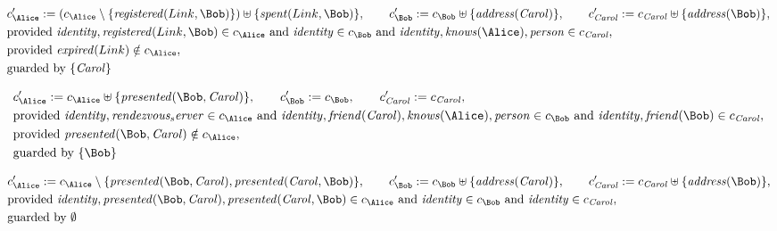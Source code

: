 \begin{align*}
&
c'_
{
\Alice
}
 := 
(c_
{
\Alice
}
 \setminus 
\{
\mathit{
registered
}
(
Link
,
\Bob
)
\}
) \uplus 
\{
\mathit{
spent
}
(
Link
,
\Bob
)
\}
, \qquad 
c'_
{
\Bob
}
 := 
c_
{
\Bob
}
 \uplus 
\{
\mathit{
address
}
(
\mathit{Carol}
)
\}
, \qquad 
c'_
{
\mathit{Carol}
}
 := 
c_
{
\mathit{Carol}
}
 \uplus 
\{
\mathit{
address
}
(
\Bob
)
\}
,\\
&
\text{provided } 
\mathit{
identity
}
,
\mathit{
registered
}
(
Link
,
\Bob
)
 \in c_
{
\Alice
}
 \text{ and } 
\mathit{
identity
}
 \in c_
{
\Bob
}
 \text{ and } 
\mathit{
identity
}
,
\mathit{
knows
}
(
\Alice
)
,
\mathit{
person
}
 \in c_
{
\mathit{Carol}
}
,\\
&
\text{provided } 
\mathit{
expired
}
(
Link
)
 \notin c_
{
\Alice
}
,\\
&
\text{guarded by } \{
\mathit{Carol}
\}
\end{align*}

\begin{align*}
&
c'_
{
\Alice
}
 := 
c_
{
\Alice
}
 \uplus 
\{
\mathit{
presented
}
(
\Bob
,
\mathit{Carol}
)
\}
, \qquad 
c'_
{
\Bob
}
 := 
c_
{
\Bob
}
, \qquad 
c'_
{
\mathit{Carol}
}
 := 
c_
{
\mathit{Carol}
}
,\\
&
\text{provided } 
\mathit{
identity
}
,
\mathit{
rendezvous_server
}
 \in c_
{
\Alice
}
 \text{ and } 
\mathit{
identity
}
,
\mathit{
friend
}
(
\mathit{Carol}
)
,
\mathit{
knows
}
(
\Alice
)
,
\mathit{
person
}
 \in c_
{
\Bob
}
 \text{ and } 
\mathit{
identity
}
,
\mathit{
friend
}
(
\Bob
)
 \in c_
{
\mathit{Carol}
}
,\\
&
\text{provided } 
\mathit{
presented
}
(
\Bob
,
\mathit{Carol}
)
 \notin c_
{
\Alice
}
,\\
&
\text{guarded by } \{
\Bob
\}
\end{align*}

\begin{align*}
&
c'_
{
\Alice
}
 := 
c_
{
\Alice
}
 \setminus 
\{
\mathit{
presented
}
(
\Bob
,
\mathit{Carol}
)
,
\mathit{
presented
}
(
\mathit{Carol}
,
\Bob
)
\}
, \qquad 
c'_
{
\Bob
}
 := 
c_
{
\Bob
}
 \uplus 
\{
\mathit{
address
}
(
\mathit{Carol}
)
\}
, \qquad 
c'_
{
\mathit{Carol}
}
 := 
c_
{
\mathit{Carol}
}
 \uplus 
\{
\mathit{
address
}
(
\Bob
)
\}
,\\
&
\text{provided } 
\mathit{
identity
}
,
\mathit{
presented
}
(
\Bob
,
\mathit{Carol}
)
,
\mathit{
presented
}
(
\mathit{Carol}
,
\Bob
)
 \in c_
{
\Alice
}
 \text{ and } 
\mathit{
identity
}
 \in c_
{
\Bob
}
 \text{ and } 
\mathit{
identity
}
 \in c_
{
\mathit{Carol}
}
,\\
&
\text{guarded by } \emptyset
\end{align*}
